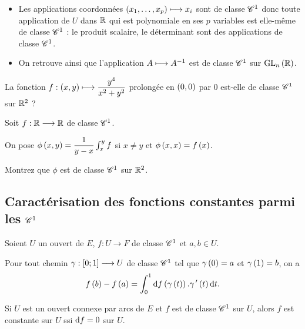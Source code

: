 \begin{ex}
\begin{itemize}
    \item Les applications coordonnées \(\left(x_1,\dots,x_p\right)\longmapsto x_i\) sont de classe \(\mathscr{C}^{1}\) donc toute application de \(U\) dans \(\mathbb{R}\) qui est polynomiale en ses \(p\) variables est elle-même de classe \(\mathscr{C}^{1}\) : le produit scalaire, le déterminant sont des applications de classe \(\mathscr{C}^{1}\). \\
    \item On retrouve ainsi que l'application \(A\longmapsto A^{-1}\) est de classe \(\mathscr{C}^{1}\) sur \(\GL{n}[\R]\).
\end{itemize}
\end{ex}

\begin{exo}
La fonction \(f:\left(x,y\right)\longmapsto\dfrac{y^4}{x^2+y^2}\) prolongée en \(\left(0,0\right)\) par \(0\) est-elle de classe \(\mathscr{C}^{1}\) sur \(\mathbb{R}^2\) ?
\end{exo}

\begin{exo}
Soit \(f:\mathbb{R}\longrightarrow\mathbb{R}\) de classe \(\mathscr{C}^{1}\).

On pose \(\phi\left(x,y\right)=\dfrac{1}{y-x}\int_x^yf\) si \(x\not=y\) et \(\phi\left(x,x\right)=f\left(x\right)\).

Montrez que \(\phi\) est de classe \(\mathscr{C}^{1}\) sur \(\mathbb{R}^2\).
\end{exo}

\subsection{Caractérisation des fonctions constantes parmi les \(\mathscr{C}^{1}\)}

\begin{prop}
Soient \(U\) un ouvert de \(E\), \(f:U\to F\) de classe \(\mathscr{C}^{1}\) et \(a,b\in U\).

Pour tout chemin \(\gamma:\left[0;1\right]\longrightarrow U\) de classe \(\mathscr{C}^{1}\) tel que \(\gamma\left(0\right)=a\) et \(\gamma\left(1\right)=b\), on a \[f\paren{b}-f\paren{a}=\int_0^1\odif{f}\paren{\gamma\paren{t}}.\gamma\prim\paren{t}\odif{t}.\]
\end{prop}

\begin{theo}
Si \(U\) est un ouvert connexe par arcs de \(E\) et \(f\) est de classe \(\mathscr{C}^{1}\) sur \(U\), alors \(f\) est constante sur \(U\) ssi \(\odif{f}=0\) sur \(U\).
\end{theo}

